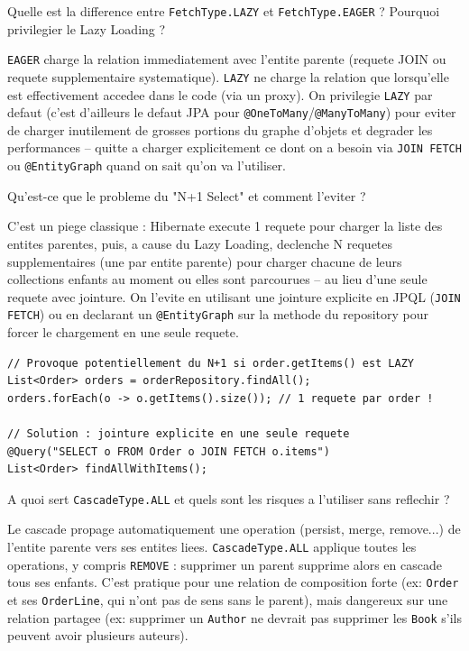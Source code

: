 \documentclass[11pt,a4paper]{article}
\begin{document}
\begin{question} Quelle est la difference entre \texttt{FetchType.LAZY} et \texttt{FetchType.EAGER} ? Pourquoi privilegier le Lazy Loading ?
\end{question}
\begin{reponse}
\texttt{EAGER} charge la relation immediatement avec l'entite parente (requete JOIN ou requete supplementaire systematique). \texttt{LAZY} ne charge la relation que lorsqu'elle est effectivement accedee dans le code (via un proxy). On privilegie \texttt{LAZY} par defaut (c'est d'ailleurs le defaut JPA pour \texttt{@OneToMany}/\texttt{@ManyToMany}) pour eviter de charger inutilement de grosses portions du graphe d'objets et degrader les performances -- quitte a charger explicitement ce dont on a besoin via \texttt{JOIN FETCH} ou \texttt{@EntityGraph} quand on sait qu'on va l'utiliser.
\end{reponse}

\begin{question} Qu'est-ce que le probleme du "N+1 Select" et comment l'eviter ?
\end{question}
\begin{reponse}
C'est un piege classique : Hibernate execute 1 requete pour charger la liste des entites parentes, puis, a cause du Lazy Loading, declenche N requetes supplementaires (une par entite parente) pour charger chacune de leurs collections enfants au moment ou elles sont parcourues -- au lieu d'une seule requete avec jointure. On l'evite en utilisant une jointure explicite en JPQL (\texttt{JOIN FETCH}) ou en declarant un \texttt{@EntityGraph} sur la methode du repository pour forcer le chargement en une seule requete.
\end{reponse}

\begin{lstlisting}
// Provoque potentiellement du N+1 si order.getItems() est LAZY
List<Order> orders = orderRepository.findAll();
orders.forEach(o -> o.getItems().size()); // 1 requete par order !

// Solution : jointure explicite en une seule requete
@Query("SELECT o FROM Order o JOIN FETCH o.items")
List<Order> findAllWithItems();
\end{lstlisting}

\begin{question} A quoi sert \texttt{CascadeType.ALL} et quels sont les risques a l'utiliser sans reflechir ?
\end{question}
\begin{reponse}
Le cascade propage automatiquement une operation (persist, merge, remove...) de l'entite parente vers ses entites liees. \texttt{CascadeType.ALL} applique toutes les operations, y compris \texttt{REMOVE} : supprimer un parent supprime alors en cascade tous ses enfants. C'est pratique pour une relation de composition forte (ex: \texttt{Order} et ses \texttt{OrderLine}, qui n'ont pas de sens sans le parent), mais dangereux sur une relation partagee (ex: supprimer un \texttt{Author} ne devrait pas supprimer les \texttt{Book} s'ils peuvent avoir plusieurs auteurs).
\end{reponse}
\end{document}
